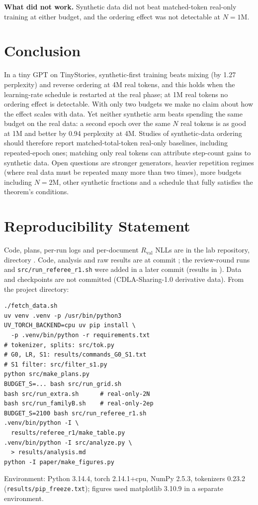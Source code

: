 \documentclass[conference]{IEEEtran}
\begin{document}
\textbf{What did not work.} Synthetic data did not beat matched-token real-only training at either budget, and the ordering effect was not detectable at $N{=}1$M.

\section{Conclusion}
In a tiny GPT on TinyStories, synthetic-first training beats mixing (by 1.27 perplexity) and reverse ordering at 4M real tokens, and this holds when the learning-rate schedule is restarted at the real phase; at 1M real tokens no ordering effect is detectable. With only two budgets we make no claim about how the effect scales with data. Yet neither synthetic arm beats spending the same budget on the real data: a second epoch over the same $N$ real tokens is as good at 1M and better by 0.94 perplexity at 4M. Studies of synthetic-data ordering should therefore report matched-total-token real-only baselines, including repeated-epoch ones; matching only real tokens can attribute step-count gains to synthetic data. Open questions are stronger generators, heavier repetition regimes (where real data must be repeated many more than two times), more budgets including $N{=}2$M, other synthetic fractions and a schedule that fully satisfies the theorem's conditions.

\section*{Reproducibility Statement}
{\sloppy Code, plans, per-run logs and per-document $R_{\text{val}}$ NLLs are in the lab repository, directory . Code, analysis and raw results are at commit \texttt{}; the review-round runs and \texttt{src/run\_referee\_r1.sh} were added in a later commit (results in ). Data and checkpoints are not committed (CDLA-Sharing-1.0 derivative data). From the project directory:\par}
\begin{footnotesize}
\begin{verbatim}
./fetch_data.sh
uv venv .venv -p /usr/bin/python3
UV_TORCH_BACKEND=cpu uv pip install \
  -p .venv/bin/python -r requirements.txt
# tokenizer, splits: src/tok.py
# G0, LR, S1: results/commands_G0_S1.txt
# S1 filter: src/filter_s1.py
python src/make_plans.py
BUDGET_S=... bash src/run_grid.sh
bash src/run_extra.sh      # real-only-2N
bash src/run_familyB.sh    # real-only-2ep
BUDGET_S=2100 bash src/run_referee_r1.sh
.venv/bin/python -I \
  results/referee_r1/make_table.py
.venv/bin/python -I src/analyze.py \
  > results/analysis.md
python -I paper/make_figures.py
\end{verbatim}
\end{footnotesize}
\noindent Environment: Python 3.14.4, torch 2.14.1+cpu, NumPy 2.5.3, tokenizers 0.23.2 (\texttt{results/pip\_freeze.txt}); figures used matplotlib 3.10.9 in a separate environment.
\end{document}
